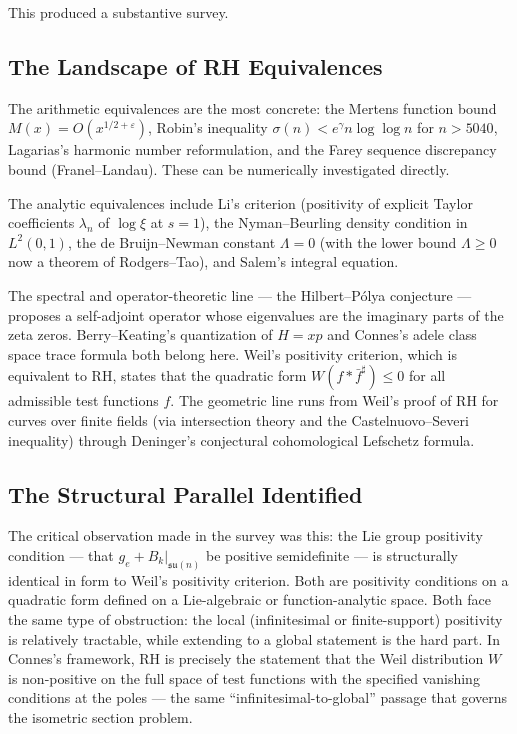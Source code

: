\documentclass[12pt]{article}
\begin{document}
This produced a substantive survey.

\subsection{The Landscape of RH Equivalences}

The arithmetic equivalences are the most concrete: the Mertens function bound
$M(x) = O(x^{1/2+\varepsilon})$, Robin's inequality
$\sigma(n) < e^\gamma n \log\log n$ for $n > 5040$, Lagarias's harmonic number
reformulation, and the Farey sequence discrepancy bound (Franel--Landau). These can be
numerically investigated directly.

The analytic equivalences include Li's criterion (positivity of explicit Taylor
coefficients $\lambda_n$ of $\log \xi$ at $s=1$), the Nyman--Beurling density
condition in $L^2(0,1)$, the de Bruijn--Newman constant $\Lambda = 0$ (with the lower
bound $\Lambda \geq 0$ now a theorem of Rodgers--Tao), and Salem's integral equation.

The spectral and operator-theoretic line --- the Hilbert--P\'{o}lya conjecture ---
proposes a self-adjoint operator whose eigenvalues are the imaginary parts of the zeta
zeros. Berry--Keating's quantization of $H = xp$ and Connes's adele class space trace
formula both belong here. Weil's positivity criterion, which is equivalent to RH,
states that the quadratic form $W(f * \bar{f}^\sharp) \leq 0$ for all admissible test
functions $f$. The geometric line runs from Weil's proof of RH for curves over finite
fields (via intersection theory and the Castelnuovo--Severi inequality) through
Deninger's conjectural cohomological Lefschetz formula.

\subsection{The Structural Parallel Identified}

The critical observation made in the survey was this: the Lie group positivity
condition --- that $g_e + B_k|_{\mathfrak{su}(n)}$ be positive semidefinite --- is
structurally identical in form to Weil's positivity criterion. Both are positivity
conditions on a quadratic form defined on a Lie-algebraic or function-analytic space.
Both face the same type of obstruction: the local (infinitesimal or finite-support)
positivity is relatively tractable, while extending to a global statement is the hard
part. In Connes's framework, RH is precisely the statement that the Weil distribution
$W$ is non-positive on the full space of test functions with the specified vanishing
conditions at the poles --- the same ``infinitesimal-to-global'' passage that governs
the isometric section problem.
\end{document}
